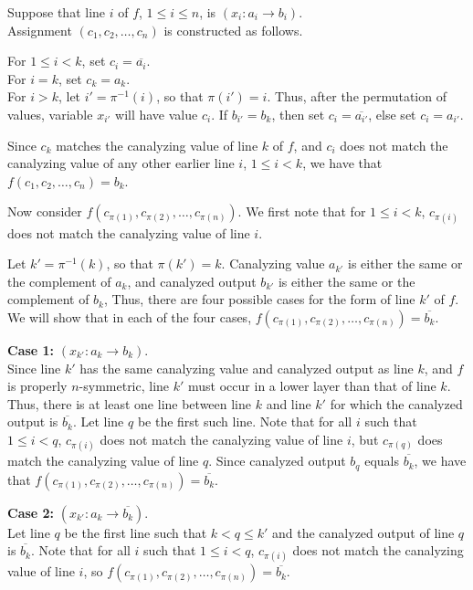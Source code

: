 Suppose that line $i$ of $f$, $1 \leq i \leq n$, is \noindent $(x_i
: a_i \rightarrow b_i)$. \\ Assignment $(c_1, c_2, \ldots,  c_n)$
is constructed as follows.

\noindent
For $1 \leq i < k$, set $c_i = \overline{a_i}$. \\ For $i = k$, set
$c_k =a_k$. \\ For $i > k$, let $i' = \pi^{-1}(i)$, so that $\pi(i')
= i$.  Thus, after the permutation of values, variable $x_{i'}$
will have value $c_i$.  If $b_{i'} = b_k$, then set $c_i =
\overline{a_{i'}}$, else set $c_i =  a_{i'}$.

Since $c_k$ matches the canalyzing value of line $k$ of $f$, and
$c_i$ does not match the canalyzing value of any other earlier line
$i$, $1 \leq i < k$, we have that $f(c_1, c_2, \ldots,  c_n) = b_k$.

Now consider $f(c_{\pi(1)}, c_{\pi(2)}, \ldots, c_{\pi(n)})$.  We
first note that for $1 \leq i < k$, $c_{\pi(i)}$ does not match the
canalyzing value of line $i$.

Let $k' = \pi^{-1}(k)$, so that $\pi(k') = k$.  Canalyzing value
$a_{k'}$ is either the same or the complement of $a_k$, and canalyzed
output $b_{k'}$ is either the same or the complement of $b_k$, Thus,
there are four possible cases for the form of line $k'$ of $f$.  We
will show that in each of the four cases, $f(c_{\pi(1)}, c_{\pi(2)},
\ldots, c_{\pi(n)}) = \overline{b_k}$.

\noindent
{\bf Case 1:} $(x_{k'} : a_k \rightarrow b_k)$. \\ 

Since line $k'$
has the same canalyzing value and canalyzed output as line $k$, and
$f$ is properly $n$-symmetric, line $k'$ must occur in a lower layer
than that of line $k$.  Thus, there is at least one line between
line $k$ and line $k'$ for which the canalyzed output is $\overline{b_k}$.
Let line $q$ be the first such line.  Note that for all $i$ such
that $1 \leq i < q$, $c_{\pi(i)}$ does not match the canalyzing
value of line $i$, but $c_{\pi(q)}$ does match the canalyzing value
of line $q$.  Since canalyzed output $b_q$ equals $\overline{b_k}$,
we have that $f(c_{\pi(1)}, c_{\pi(2)}, \ldots, c_{\pi(n)}) =
\overline{b_k}$.

\noindent
{\bf Case 2:} $(x_{k'} : a_k \rightarrow \overline{b_k})$. \\

Let line $q$ be the first line such that $k < q \leq k'$ and
the canalyzed output of line $q$ is $\overline{b_k}$.
Note that for all $i$ such that $1 \leq i < q$, 
$c_{\pi(i)}$ does not match the canalyzing value of line $i$,
so $f(c_{\pi(1)}, c_{\pi(2)}, \ldots, c_{\pi(n)}) = \overline{b_k}$.

